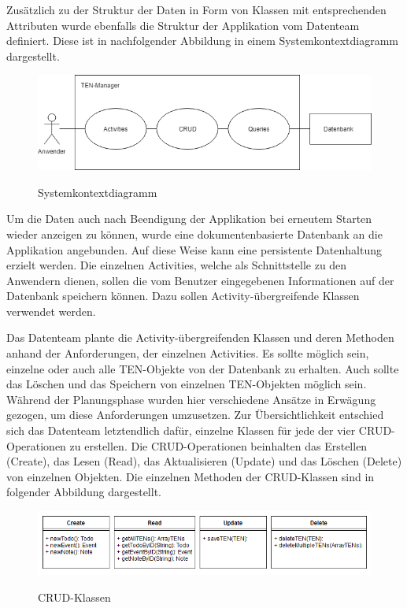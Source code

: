 Zusätzlich zu der Struktur der Daten in Form von Klassen mit entsprechenden Attributen wurde ebenfalls die Struktur der Applikation vom Datenteam definiert. Diese ist in nachfolgender Abbildung in einem Systemkontextdiagramm dargestellt.

\begin{figure}[H]
\centering
\begin{minipage}[t]{1\textwidth} %
\caption{Systemkontextdiagramm} %
\includegraphics[width=1\textwidth]{img/Systemkontextdiagramm}\\ %
\end{minipage}
\end{figure}

Um die Daten auch nach Beendigung der Applikation bei erneutem Starten wieder anzeigen zu können, wurde eine dokumentenbasierte Datenbank an die Applikation angebunden. Auf diese Weise kann eine persistente Datenhaltung erzielt werden. Die einzelnen Activities, welche als Schnittstelle zu den Anwendern dienen, sollen die vom Benutzer eingegebenen Informationen auf der Datenbank speichern können. Dazu sollen Activity-übergreifende Klassen verwendet werden.

Das Datenteam plante die Activity-übergreifenden Klassen und deren Methoden anhand der Anforderungen, der einzelnen Activities. Es sollte möglich sein, einzelne oder auch alle TEN-Objekte von der Datenbank zu erhalten. Auch sollte das Löschen und das Speichern von einzelnen TEN-Objekten möglich sein. Während der Planungsphase wurden hier verschiedene Ansätze in Erwägung gezogen, um diese Anforderungen umzusetzen. Zur Übersichtlichkeit entschied sich das Datenteam letztendlich dafür, einzelne Klassen für jede der vier CRUD-Operationen zu erstellen. Die CRUD-Operationen beinhalten das Erstellen (Create), das Lesen (Read), das Aktualisieren (Update) und das Löschen (Delete) von einzelnen Objekten. Die einzelnen Methoden der CRUD-Klassen sind in folgender Abbildung dargestellt.

\begin{figure}[H]
\centering
\begin{minipage}[t]{1\textwidth} %
\caption{CRUD-Klassen} %
\includegraphics[width=1\textwidth]{img/CRUD-Klassen}\\ %
\end{minipage}
\end{figure}

